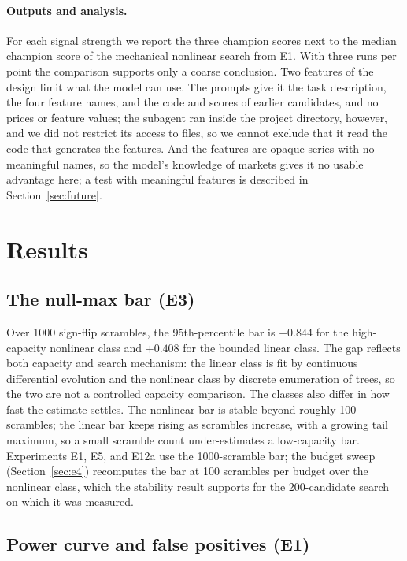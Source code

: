 \documentclass[11pt]{article}
\begin{document}
\paragraph{Outputs and analysis.} For each signal strength we report the three champion scores next
to the median champion score of the mechanical nonlinear search from E1. With three runs per point the
comparison supports only a coarse conclusion. Two features of the design limit what the model can use.
The prompts give it the task description, the four feature names, and the code and scores of earlier
candidates, and no prices or feature values; the subagent ran inside the project directory, however, and
we did not restrict its access to files, so we cannot exclude that it read the code that generates the
features. And the features are opaque series with no meaningful names, so the model's knowledge of
markets gives it no usable advantage here; a test with meaningful features is described in
Section~\ref{sec:future}.
\section{Results}
\label{sec:results}

\subsection{The null-max bar (E3)}
\label{sec:e3}

Over 1000 sign-flip scrambles, the 95th-percentile bar is $+0.844$ for the high-capacity nonlinear
class and $+0.408$ for the bounded linear class. The gap reflects both capacity and search mechanism:
the linear class is fit by continuous differential evolution and the nonlinear class by discrete
enumeration of trees, so the two are not a controlled capacity comparison. The classes also differ in
how fast the estimate settles. The nonlinear bar is stable beyond roughly 100 scrambles; the linear
bar keeps rising as scrambles increase, with a growing tail maximum, so a small scramble count
under-estimates a low-capacity bar. Experiments E1, E5, and E12a use the 1000-scramble bar; the
budget sweep (Section~\ref{sec:e4}) recomputes the bar at 100 scrambles per budget over the
nonlinear class, which the stability result supports for the 200-candidate search on which it was
measured.

\subsection{Power curve and false positives (E1)}
\label{sec:e1}
\end{document}
